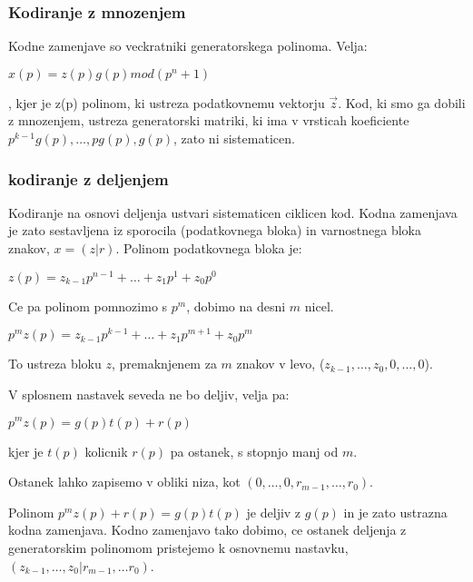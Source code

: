 \documentclass{article}
\begin{document}
\begin{multicols}{2}
	\subsubsection{Kodiranje z mnozenjem}
	Kodne zamenjave so veckratniki generatorskega polinoma.
	Velja:
	\begin{center}
		\begin{math}
			x(p) = z(p) g(p) mod (p^n + 1)
		\end{math}
	\end{center}, kjer je z(p) polinom, ki ustreza podatkovnemu vektorju $\vec{z}$.
	Kod, ki smo ga dobili z mnozenjem, ustreza generatorski matriki, ki ima v vrsticah
	koeficiente $p^{k-1}g(p), \dots, pg(p), g(p)$, zato ni sistematicen.

	\subsubsection{kodiranje z deljenjem}
	Kodiranje na osnovi deljenja ustvari sistematicen ciklicen kod. Kodna zamenjava je zato sestavljena iz sporocila
	(podatkovnega bloka) in varnostnega bloka znakov, $x = (z | r)$.
	Polinom podatkovnega bloka je:
	\begin{center}
		\begin{math}
			z(p) = z_{k-1}p^{n-1} + \dots + z_1p^{1} + z_0p^0
		\end{math}
	\end{center}
	Ce pa polinom pomnozimo s $p^m$, dobimo na desni $m$ nicel.
	\begin{center}
		\begin{math}
			p^m z(p) = z_{k-1}p^{k-1} + \dots + z_1p^{m+1} + z_0p^m
		\end{math}
	\end{center}
	To ustreza bloku $z$, premaknjenem za $m$ znakov v levo, ($z_{k-1}, \dots, z_0, 0, \dots, 0$).

	V splosnem nastavek seveda ne bo deljiv, velja pa:
	\begin{center}
		$p^mz(p) = g(p)t(p) + r(p)$
	\end{center}
	kjer je $t(p)$ kolicnik
	$r(p)$ pa ostanek, s stopnjo manj od $m$.

	Ostanek lahko zapisemo v obliki niza, kot $(0, \dots, 0, r_{m-1}, \dots, r_0)$.

	Polinom $p^m z(p) + r(p) = g(p)t(p)$ je deljiv z $g(p)$ in je zato ustrazna kodna zamenjava.
	Kodno zamenjavo tako dobimo, ce ostanek deljenja z generatorskim polinomom pristejemo k osnovnemu
	nastavku, $(z_{k-1}, \dots, z_0 | r_{m-1}, \dots r_0)$.


\end{multicols}
\end{document}
